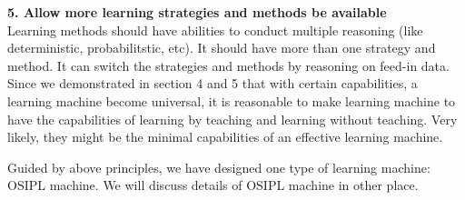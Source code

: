 {\bf 5. Allow more learning strategies and methods be available} \\
Learning methods should have abilities to conduct multiple reasoning (like deterministic, probabilitstic, etc). It should have more than one strategy and method. It can switch the strategies and methods by reasoning on feed-in data. Since we demonstrated in section 4 and 5 that with certain capabilities, a learning machine become universal, it is reasonable to make learning machine to have the capabilities of learning by teaching and learning without teaching. Very likely, they might be the minimal capabilities of an effective learning machine. 


Guided by above principles, we have designed one type of learning machine: OSIPL machine. We will discuss details of OSIPL machine in other place.  

